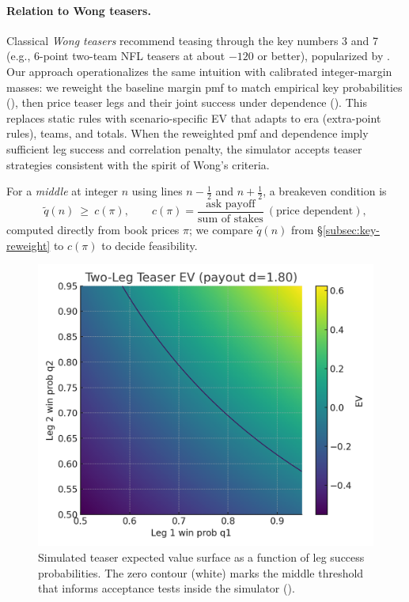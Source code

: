 \paragraph{Relation to Wong teasers.}
Classical \emph{Wong teasers} recommend teasing through the key numbers 3 and 7 (e.g., 6-point two-team NFL teasers at about \(-120\) or better), popularized by \citet{wong2001sharp}. Our approach operationalizes the same intuition with calibrated integer-margin masses: we reweight the baseline margin pmf to match empirical key probabilities (), then price teaser legs and their joint success under dependence (). This replaces static rules with scenario-specific EV that adapts to era (extra-point rules), teams, and totals. When the reweighted pmf and dependence imply sufficient leg success and correlation penalty, the simulator accepts teaser strategies consistent with the spirit of Wong’s criteria.

For a \emph{middle} at integer $n$ using lines $n\!-\!\tfrac12$ and $n\!+\!\tfrac12$, a breakeven condition is
\[
\tilde q(n)\ \ge\ c(\pi),\qquad
c(\pi)=\frac{\text{ask payoff}}{\text{sum of stakes}}\ (\text{price dependent}),
\]
computed directly from book prices $\pi$; we compare $\tilde q(n)$ from \S\ref{subsec:key-reweight}
to $c(\pi)$ to decide feasibility.

\begin{figure}[t]
  \centering
  \includegraphics[width=0.9\linewidth]{../figures/teaser_ev_heatmap.png}
  \caption{Simulated teaser expected value surface as a function of leg success probabilities. The zero contour (white) marks the middle threshold that informs acceptance tests inside the simulator ().}
  \label{fig:sim-teaser-surface}
\end{figure}


